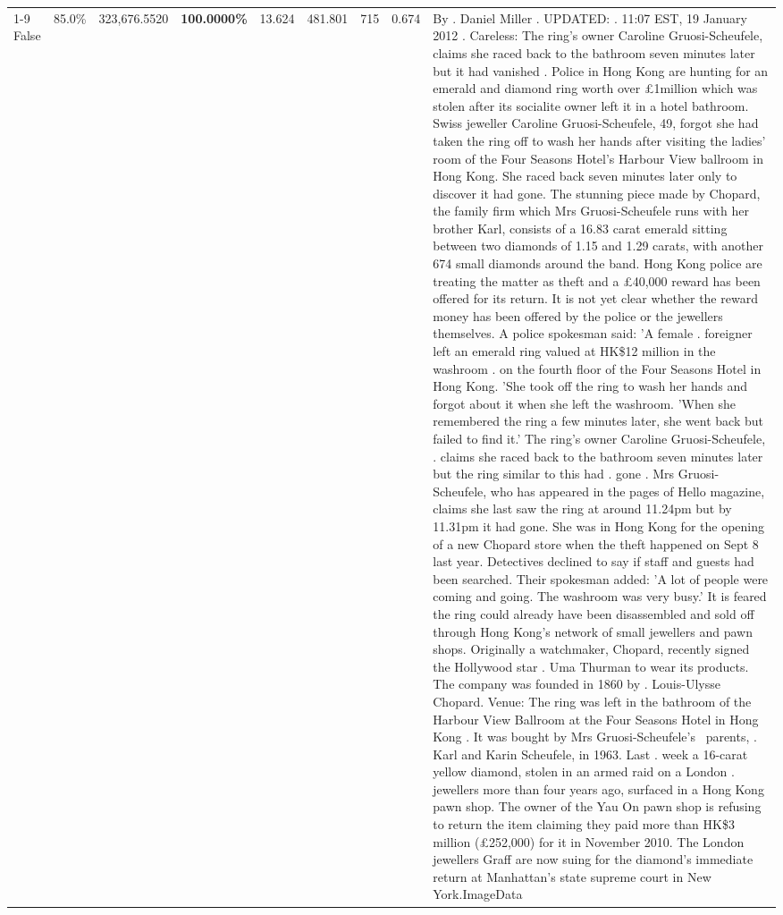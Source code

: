 \begin{table}[H]
\begin{tabular}{lllrlllll}
\cline{1-9}
False & 85.0\% & 323,676.5520 & \bfseries \color{red} 100.0000\% & 13.624 & 481.801 & 715 & 0.674 & By . Daniel Miller . UPDATED: . 11:07 EST, 19 January 2012 . Careless: The ring's owner Caroline Gruosi-Scheufele, claims she raced back to the bathroom seven minutes later but it had vanished . Police in Hong Kong are hunting for an emerald and diamond ring worth over £1million which was stolen after its socialite owner left it in a hotel bathroom. Swiss jeweller Caroline Gruosi-Scheufele, 49, forgot she had taken the ring off to wash her hands after visiting the ladies' room of the Four Seasons Hotel's Harbour View ballroom in Hong Kong. She raced back seven minutes later only to discover it had gone. The stunning piece made by Chopard, the family firm which Mrs Gruosi-Scheufele runs with her brother Karl, consists of a 16.83 carat emerald sitting between two diamonds of 1.15 and 1.29 carats, with another 674 small diamonds around the band. Hong Kong police are treating the matter as theft and a £40,000 reward has been offered for its return. It is not yet clear whether the reward money has been offered by the police or the jewellers themselves. A police spokesman said: 'A female . foreigner left an emerald ring valued at HK\$12 million in the washroom . on the fourth floor of the Four Seasons Hotel in Hong Kong. 'She took off the ring to wash her hands and forgot about it when she left the washroom. 'When she remembered the ring a few minutes later, she went back but failed to find it.' The ring's owner Caroline Gruosi-Scheufele, . claims she raced back to the bathroom seven minutes later but the ring similar to this had . gone . Mrs Gruosi-Scheufele, who has appeared in the pages of Hello magazine, claims she last saw the ring at around 11.24pm but by 11.31pm it had gone. She was in Hong Kong for the opening of a new Chopard store when the theft happened on Sept 8 last year. Detectives declined to say if staff and guests had been searched. Their spokesman added: 'A lot of people were coming and going. The washroom was very busy.' It is feared the ring could already have been disassembled and sold off through Hong Kong's network of small jewellers and pawn shops. Originally a watchmaker, Chopard, recently signed the Hollywood star . Uma Thurman to wear its products. The company was founded in 1860 by . Louis-Ulysse Chopard. Venue: The ring was left in the bathroom of the Harbour View Ballroom at the Four Seasons Hotel in Hong Kong . It was bought by Mrs Gruosi-Scheufele's  parents, . Karl and Karin Scheufele, in 1963. Last . week a 16-carat yellow diamond, stolen in an armed raid on a London . jewellers more than four years ago, surfaced in a Hong Kong pawn shop. The owner of the Yau On pawn shop is refusing to return the item claiming they paid more than HK\$3 million (£252,000) for it in November 2010. The London jewellers Graff are now suing for the diamond’s immediate return at Manhattan’s state supreme court in New York.ImageData \\

\end{tabular}
\end{table}
